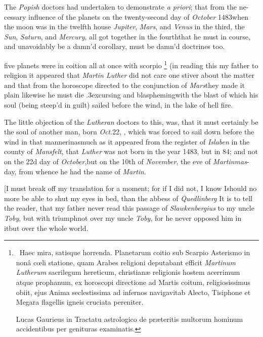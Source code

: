\documentclass{article}
\begin{document}
The \textit{Popish} doctors had undertaken to demonstrate
\textit{a priori}; that from the ne-\pb cessary influence of the
planets on the twenty-second day of \textit{October}
1483\tsh when the moon was in the twelfth house\break
\tsk \textit{Jupiter}, \textit{Mars}, and \textit{Venus} in the third,
the \textit{Sun}, \textit{Saturn}, and \textit{Mercury}, all got together
in the fourth\tsk that he must in course, and unavoidably
be a damn’d\break
{}
corollary, must be damn’d doctrines too.

\noindent
{}
five planets were in coition all at once
with scorpio \footnote{\ Haec mira, satisque horrenda.
Planetarum coitio sub Scarpio Asterismo in nonâ cœli
statione, quam Arabes religioni deputabant efficit
\textit{Martinum Lutherum} sacrilegum hereticum, christianæ
religionis hostem acerrimum atque prophanum, ex horoscopi
directione ad Martis coitum, religiosissimus obiit, ejus
Anima seclestissima ad infernos navigavit\tsk ab Alecto,
Tisiphone et Megara flagellis igneis cruciata pereniter.

\tsk Lucas Gaurieus in Tractatu astrologico de\break
præteritis multorum hominum accidentibus per genituras examinatis.} (in reading this my
father\pb
{}
to religion\tsk
it appeared that \textit{Martin Lu\-ther} did not care one stiver about the matter
\tsk and that from the horoscope directed to the conjunction of \textit{Mars}\tsk they
made it plain likewise he must die\break
\lower.3ex\hbox{c}ursing and
blaspheming\tsk with the blast of
which his soul (being steep’d in guilt) sailed before the wind, in the lake of
\break
hell fire.

The little objection of the \textit{Lutheran}\break
doctors to this, was, that it must certainly be the
soul of another man, born \textit{Oct}.\@ 22,\break
\null{}, which was forced to sail down before the wind in that manner\tsk inasmuch as it
appeared from the register of \textit{Islaben} in the county of
\textit{Mansfelt}, that \textit{Luther} was not born in the year 1483,
but in 84; and not on the 22d day of \textit{October},\pb but on the
10th of \textit{November}, the eve of \textit{Martinmas}-day, from
whence he had the name of \textit{Martin}.

[\tsh I must break off my translation for a moment; for if I
did not, I know I\break should no more be able to shut my
eyes in bed, than the abbess of \textit{Quedlinberg}\tsk\break
It is to tell the reader, that my father never read this
passage of \textit{Slawkenbergius} to my uncle
\textit{Toby}, but with triumph\tsk not over my uncle
\textit{Toby}, for he never opposed him in it\tsk but over
the whole world.
\end{document}
